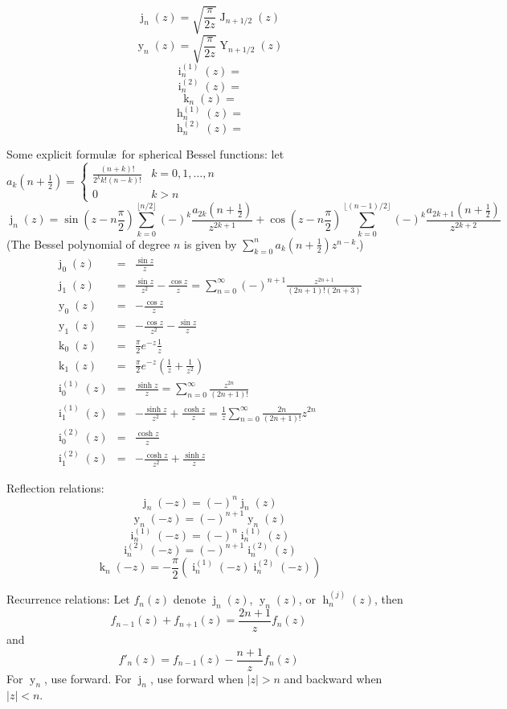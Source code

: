 \documentclass[10pt,dvipdfmx,letterpaper,twoside]{article}
\let\O=\operatorname
\begin{document}
\[ \O{j}_n(z) = \sqrt{\frac{\pi}{2z}} \O{J}_{n+1/2}(z) \]
\[ \O{y}_n(z) = \sqrt{\frac{\pi}{2z}} \O{Y}_{n+1/2}(z) \]
\[ \O{i}^{(1)}_n(z) = \]
\[ \O{i}^{(2)}_n(z) = \]
\[ \O{k}_n(z) = \]
\[ \O{h}^{(1)}_n(z) = \]
\[ \O{h}^{(2)}_n(z) = \]

Some explicit formul\ae\ for spherical Bessel functions:
let $a_k(n+\tfrac12) = \begin{cases}\frac{(n+k)!}{2^k k! (n-k)!} & k=0,1,\dots,n\\0&k>n\end{cases}$
\[ \O{j}_n(z) = \sin(z - n\frac\pi2)\sum_{k=0}^{\lfloor n/2\rfloor}(-)^k\frac{a_{2k}(n+\tfrac12)}{z^{2k+1}}
    + \cos(z - n\frac\pi2)\sum_{k=0}^{\lfloor (n-1)/2\rfloor}(-)^k\frac{a_{2k+1}(n+\tfrac12)}{z^{2k+2}} \]
(The Bessel polynomial of degree $n$ is given by $\sum_{k=0}^n a_k(n+\tfrac12)z^{n-k}$.)
\begin{eqnarray*}
\O{j}_0(z) &=& \frac{\sin z}{z} \\
\O{j}_1(z) &=& \frac{\sin z}{z^2} - \frac{\cos z}{z} = \sum_{n=0}^\infty (-)^{n+1}\frac{z^{2n+1}}{(2n+1)!(2n+3)} \\
\O{y}_0(z) &=& -\frac{\cos z}{z} \\
\O{y}_1(z) &=& -\frac{\cos z}{z^2} - \frac{\sin z}{z} \\
\O{k}_0(z) &=& \frac{\pi}{2} e^{-z} \frac{1}{z} \\
\O{k}_1(z) &=& \frac{\pi}{2} e^{-z} \left( \frac{1}{z} + \frac{1}{z^2} \right) \\
\O{i}^{(1)}_0(z) &=& \frac{\sinh z}{z} = \sum_{n=0}^\infty\frac{z^{2n}}{(2n+1)!} \\
\O{i}^{(1)}_1(z) &=& -\frac{\sinh z}{z^2} + \frac{\cosh z}{z} = \frac{1}{z}\sum_{n=0}^\infty\frac{2n}{(2n+1)!}z^{2n} \\
\O{i}^{(2)}_0(z) &=& \frac{\cosh z}{z} \\
\O{i}^{(2)}_1(z) &=& -\frac{\cosh z}{z^2} + \frac{\sinh z}{z}
\end{eqnarray*}

Reflection relations:
\[ \O{j}_n(-z) = (-)^n\O{j}_n(z) \]
\[ \O{y}_n(-z) = (-)^{n+1}\O{y}_n(z) \]
\[ \O{i}^{(1)}_n(-z) = (-)^n\O{i}^{(1)}_n(z) \]
\[ \O{i}^{(2)}_n(-z) = (-)^{n+1}\O{i}^{(2)}_n(z) \]
\[ \O{k}_n(-z) = -\frac{\pi}{2}\left( \O{i}^{(1)}_n(-z) \O{i}^{(2)}_n(-z) \right) \]

Recurrence relations:
Let $f_n(z)$ denote $\O{j}_n(z)$, $\O{y}_n(z)$, or $\O{h}^{(j)}_n(z)$, then
\[ f_{n-1}(z) + f_{n+1}(z) = \frac{2n+1}{z} f_n(z) \]
and
\[ f'_n(z) = f_{n-1}(z) - \frac{n+1}{z} f_n(z) \]
For $\O{y}_n$, use forward.  For $\O{j}_n$, use forward when $|z|>n$ and backward when $|z|<n$.
\end{document}
